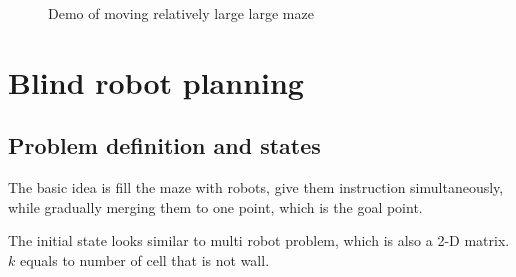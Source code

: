\documentclass{article}
\begin{document}
\begin{figure}[!t]
\normalsize
\centering
{}
\caption{Demo of moving relatively large large maze}
\label{m-5} %
\end{figure}






\clearpage
\section{Blind robot planning}
\subsection{Problem definition and states}

The basic idea is fill the maze with robots, give them instruction simultaneously, while gradually merging them to one point, which is the goal point.

The initial state looks similar to multi robot problem, which is also a 2-D matrix. $k$ equals to number of cell that is not wall.
\end{document}
